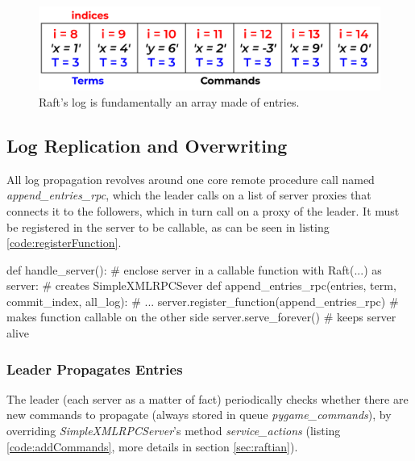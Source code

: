 \begin{figure}[h]
  \centering
  \includegraphics[width=.8\linewidth]{images/logStructure.png}
  
  \caption{Raft's log is fundamentally an array made of entries.}
  \label{fig:logStructure}
\end{figure}

\subsection{Log Replication and Overwriting} \label{sec:logReplication}

All log propagation revolves around one core remote procedure call named \textit{append\_entries\_rpc}, which the leader calls on a list of server proxies that connects it to the followers, which in turn call on a proxy of the leader. It must be registered in the server to be callable, as can be seen in listing \ref{code:registerFunction}.

\begin{python}[label={code:registerFunction}, caption={Register, thus making it callable, the remote procedure call \textit{append\_entries\_rpc}}]
def handle_server():                                    # enclose server in a callable function
    with Raft(...) as server:                           # creates SimpleXMLRPCSever
        def append_entries_rpc(entries, term, commit_index, all_log):
            # ...
        server.register_function(append_entries_rpc)    # makes function callable on the other side
        server.serve_forever()                          # keeps server alive 
\end{python}

\subsubsection{Leader Propagates Entries} \label{sec:leaderSends}

The leader (each server as a matter of fact) periodically checks whether there are new commands to propagate (always stored in queue \textit{pygame\_commands}), by overriding \textit{SimpleXMLRPCServer}'s method \textit{service\_actions} (listing \ref{code:addCommands}, more details in section \ref{sec:raftian}).

